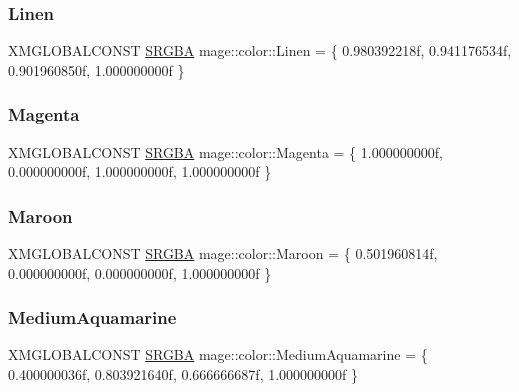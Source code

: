 \hypertarget{namespacemage_1_1color_afc79c14f1b57aa8e8080d9fafcb21427}{}\label{namespacemage_1_1color_afc79c14f1b57aa8e8080d9fafcb21427} 
\subsubsection{\texorpdfstring{Linen}{Linen}}
{\footnotesize\ttfamily X\+M\+G\+L\+O\+B\+A\+L\+C\+O\+N\+ST \hyperlink{structmage_1_1_s_r_g_b_a}{S\+R\+G\+BA} mage\+::color\+::\+Linen = \{ 0.\+980392218f, 0.\+941176534f, 0.\+901960850f, 1.\+000000000f \}}

\hypertarget{namespacemage_1_1color_a319f999ca5953b19abca47a2cb8bd382}{}\label{namespacemage_1_1color_a319f999ca5953b19abca47a2cb8bd382} 
\subsubsection{\texorpdfstring{Magenta}{Magenta}}
{\footnotesize\ttfamily X\+M\+G\+L\+O\+B\+A\+L\+C\+O\+N\+ST \hyperlink{structmage_1_1_s_r_g_b_a}{S\+R\+G\+BA} mage\+::color\+::\+Magenta = \{ 1.\+000000000f, 0.\+000000000f, 1.\+000000000f, 1.\+000000000f \}}

\hypertarget{namespacemage_1_1color_af4e34c6efa6723a5f7a0e0290583d137}{}\label{namespacemage_1_1color_af4e34c6efa6723a5f7a0e0290583d137} 
\subsubsection{\texorpdfstring{Maroon}{Maroon}}
{\footnotesize\ttfamily X\+M\+G\+L\+O\+B\+A\+L\+C\+O\+N\+ST \hyperlink{structmage_1_1_s_r_g_b_a}{S\+R\+G\+BA} mage\+::color\+::\+Maroon = \{ 0.\+501960814f, 0.\+000000000f, 0.\+000000000f, 1.\+000000000f \}}

\hypertarget{namespacemage_1_1color_a70e3d4dcf5644641bab05c9ff4e17d54}{}\label{namespacemage_1_1color_a70e3d4dcf5644641bab05c9ff4e17d54} 
\subsubsection{\texorpdfstring{Medium\+Aquamarine}{MediumAquamarine}}
{\footnotesize\ttfamily X\+M\+G\+L\+O\+B\+A\+L\+C\+O\+N\+ST \hyperlink{structmage_1_1_s_r_g_b_a}{S\+R\+G\+BA} mage\+::color\+::\+Medium\+Aquamarine = \{ 0.\+400000036f, 0.\+803921640f, 0.\+666666687f, 1.\+000000000f \}}

